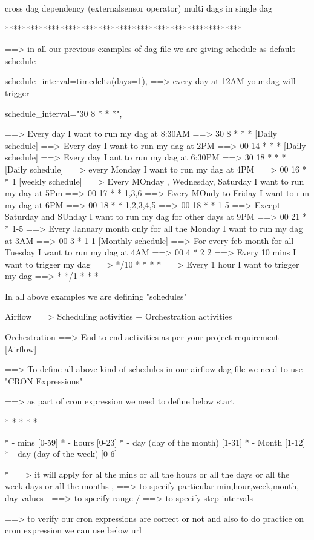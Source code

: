 
cross dag dependency (externalsensor operator)
multi dags in single dag

********************************************************

==> in all our previous examples of dag file we are giving schedule as default schedule

schedule_interval=timedelta(days=1), ==> every day at 12AM your dag will trigger

schedule_interval="30 8 * * *",


==> Every day I want to run my dag at 8:30AM ==> 30 8 * * * [Daily schedule]
==> Every day I want to run my dag at 2PM  ==> 00 14 * * * [Daily schedule]
==> Every day I ant to run my dag at 6:30PM ==> 30 18 * * * [Daily schedule]
==> every Monday I want to run my dag at 4PM ==> 00 16 * * 1 [weekly schedule]
==> Every MOnday , Wednesday, Saturday I want to run my day at 5Pm ==>  00 17 * * 1,3,6
==> Every MOndy to Friday I want to run my dag at 6PM  ==> 00 18 * * 1,2,3,4,5
													   ==> 00 18 * * 1-5
==> Except Saturday and SUnday I want to run my dag for other days at 9PM ==> 00 21 * * 1-5
==> Every January month only for all the Monday I want to run my dag at 3AM ==> 00 3 * 1 1  [Monthly schedule]
==> For every feb month for all Tuesday I want to run my dag at 4AM ==> 00 4 * 2 2
==> Every 10 mins I want to trigger my dag ==> */10 * * * *
==> Every 1 hour I want to trigger my dag ==> * */1 * * *


In all above examples we are defining "schedules"

Airflow ==> Scheduling activities + Orchestration activities

Orchestration ==> End to end activities as per your project requirement [Airflow]

==> To define all above kind of schedules in our airflow dag file we need to use "CRON Expressions"

==> as part of cron expression we need to define below start 

* * * * *

* - mins [0-59]
* - hours [0-23]
* - day (day of the month) [1-31]
* - Month [1-12]
* - day (day of the week) [0-6]

* ==> it will apply for al the mins or all the hours or all the days or all the week days or all the months
, ==> to specify particular min,hour,week,month, day values  
- ==> to specify range 
/ ==> to specify step intervals

==> to verify our cron expressions are correct or not and also to do practice on cron expression we can use below url 

